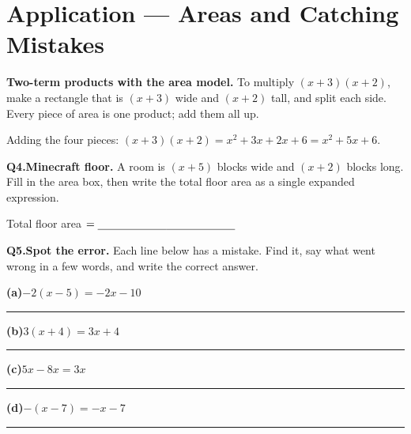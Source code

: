 \documentclass[12pt]{article}
\newcommand{\wl}{\par\vspace{5mm}\noindent\rule{\linewidth}{0.4pt}\par\vspace{1mm}}
\newcommand{\blk}{\rule[-2pt]{2.2cm}{0.4pt}} %
\begin{document}
\newpage
\section*{Application --- Areas and Catching Mistakes}
\textbf{Two-term products with the area model.} To multiply $(x+3)(x+2)$, make a rectangle that is $(x+3)$ wide and
$(x+2)$ tall, and split each side. Every piece of area is one product; add them all up.

\begin{center}
\end{center}
Adding the four pieces: $(x+3)(x+2) = x^2 + 3x + 2x + 6 = x^2 + 5x + 6$.

\bigskip
\textbf{Q4.}\quad \textbf{Minecraft floor.} A room is $(x+5)$ blocks wide and $(x+2)$ blocks long. Fill in the area
box, then write the total floor area as a single expanded expression.

\begin{center}
\end{center}
Total floor area $= \blk\blk$

\bigskip
\textbf{Q5.}\quad \textbf{Spot the error.} Each line below has a mistake. Find it, say what went wrong in a few
words, and write the correct answer.

\medskip
\textbf{(a)}\quad $-2(x-5) = -2x - 10$
\wl

\textbf{(b)}\quad $3(x+4) = 3x + 4$
\wl

\textbf{(c)}\quad $5x - 8x = 3x$
\wl

\textbf{(d)}\quad $-(x-7) = -x - 7$
\wl

\newpage
\end{document}

